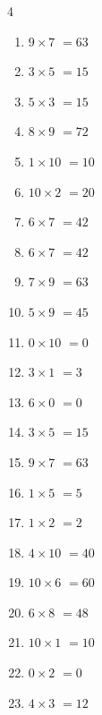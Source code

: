 \begin{multicols}{4}
\begin{enumerate}
  \item $9\times 7$
        $=63$

  \item $3\times 5$
        $=15$

  \item $5\times 3$
        $=15$

  \item $8\times 9$
        $=72$

  \item $1\times 10$
        $=10$

\columnbreak %

  \item $10\times 2$
        $=20$

  \item $6\times 7$
        $=42$

  \item $6\times 7$
        $=42$

  \item $7\times 9$
        $=63$

  \item $5\times 9$
        $=45$

  \item $0\times 10$
        $=0$

  \item $3\times 1$
        $=3$

  \item $6\times 0$
        $=0$

  \item $3\times 5$
        $=15$

  \item $9\times 7$
        $=63$

  \item $1\times 5$
        $=5$

  \item $1\times 2$
        $=2$

  \item $4\times 10$
        $=40$

  \item $10\times 6$
        $=60$

  \item $6\times 8$
        $=48$

  \item $10\times 1$
        $=10$

  \item $0\times 2$
        $=0$

  \item $4\times 3$
        $=12$


\end{enumerate}
\end{multicols}
